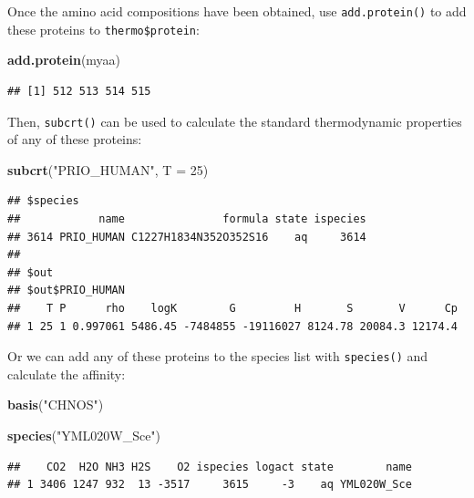 \documentclass[]{tufte-book}
\newenvironment{Shaded}{}{}
\newcommand{\KeywordTok}[1]{\textcolor[rgb]{0.00,0.44,0.13}{\textbf{#1}}}
\newcommand{\DataTypeTok}[1]{\textcolor[rgb]{0.56,0.13,0.00}{#1}}
\newcommand{\DecValTok}[1]{\textcolor[rgb]{0.25,0.63,0.44}{#1}}
\newcommand{\StringTok}[1]{\textcolor[rgb]{0.25,0.44,0.63}{#1}}
\newcommand{\NormalTok}[1]{#1}
\begin{document}
Once the amino acid compositions have been obtained, use
{\texttt{add.protein()}} to add these proteins to
\texttt{thermo\$protein}:

\begin{Shaded}
\begin{Highlighting}[]
\KeywordTok{add.protein}\NormalTok{(myaa)}
\end{Highlighting}
\end{Shaded}

\begin{verbatim}
## [1] 512 513 514 515
\end{verbatim}

Then, {\texttt{subcrt()}} can be used to calculate the standard
thermodynamic properties of any of these proteins:

\begin{Shaded}
\begin{Highlighting}[]
\KeywordTok{subcrt}\NormalTok{(}\StringTok{"PRIO_HUMAN"}\NormalTok{, }\DataTypeTok{T =} \DecValTok{25}\NormalTok{)}
\end{Highlighting}
\end{Shaded}

\begin{verbatim}
## $species
##            name               formula state ispecies
## 3614 PRIO_HUMAN C1227H1834N352O352S16    aq     3614
## 
## $out
## $out$PRIO_HUMAN
##    T P      rho    logK        G         H       S       V      Cp
## 1 25 1 0.997061 5486.45 -7484855 -19116027 8124.78 20084.3 12174.4
\end{verbatim}

Or we can add any of these proteins to the species list with
{\texttt{species()}} and calculate the affinity:

\begin{Shaded}
\begin{Highlighting}[]
\KeywordTok{basis}\NormalTok{(}\StringTok{"CHNOS"}\NormalTok{)}
\end{Highlighting}
\end{Shaded}

\begin{Shaded}
\begin{Highlighting}[]
\KeywordTok{species}\NormalTok{(}\StringTok{"YML020W_Sce"}\NormalTok{)}
\end{Highlighting}
\end{Shaded}

\begin{verbatim}
##    CO2  H2O NH3 H2S    O2 ispecies logact state        name
## 1 3406 1247 932  13 -3517     3615     -3    aq YML020W_Sce
\end{verbatim}
\end{document}
